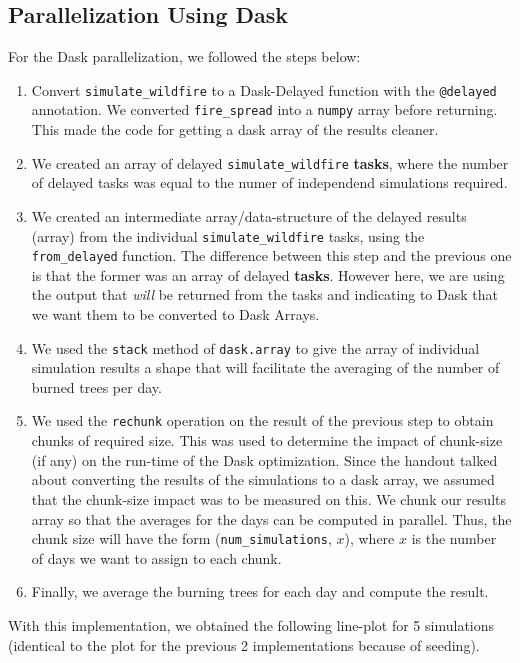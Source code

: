 \documentclass[a4paper,12pt]{article}
\begin{document}
\subsection{Parallelization Using Dask}
For the Dask parallelization, we followed the steps below: 
\begin{enumerate}
\item Convert \verb|simulate_wildfire| to a Dask-Delayed function with the \verb|@delayed| annotation. We converted \verb|fire_spread| into a \verb|numpy| array before returning. This made the code for getting a dask array of the results cleaner.
\item We created an array of delayed \verb|simulate_wildfire| \textbf{tasks}, where the number of delayed tasks was equal to the numer of independend simulations required.
\item We created an intermediate array/data-structure of the delayed results (array) from the individual \verb|simulate_wildfire| tasks, using the \verb|from_delayed| function. The difference between this step and the previous one is that the former was an array of delayed \textbf{tasks}. However here, we are using the output that \textit{will} be returned from the tasks and indicating to Dask that we want them to be converted to Dask Arrays.
\item We used the \verb|stack| method of \verb|dask.array| to give the array of individual simulation results a shape that will facilitate the averaging of the number of burned trees per day.
\item We used the \verb|rechunk| operation on the result of the previous step to obtain chunks of required size. This was used to determine the impact of chunk-size (if any) on the run-time of the Dask optimization. Since the handout talked about converting the results of the simulations to a dask array, we assumed that the chunk-size impact was to be measured on this. We chunk our results array so that the averages for the days can be computed in parallel. Thus, the chunk size will have the form (\verb|num_simulations|, $x$), where $x$ is the number of days we want to assign to each chunk.
\item Finally, we average the burning trees for each day and compute the result. 
\end{enumerate}

With this implementation, we obtained the following line-plot for 5 simulations (identical to the plot for the previous 2 implementations because of seeding).
\end{document}
